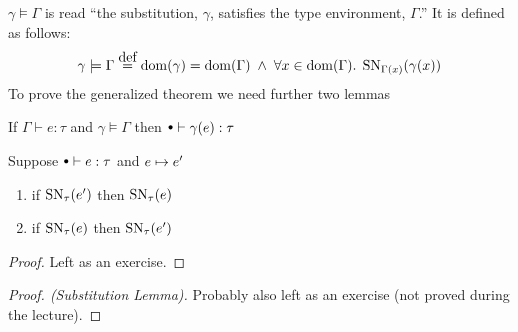 $\gamma \models \Gamma$ is read ``the substitution, $\gamma$, satisfies the type environment, $\Gamma$.'' It is defined as follows:
\[
  \gamma \models \Gamma \eqdef \dom(\gamma) = \dom(\Gamma) \pand 
                 \forall x \in \dom(\Gamma). \; \SN{\Gamma(x)}{\gamma(x)}
\]
To prove the generalized theorem we need further two lemmas
\begin{substlem}
  If $\Gamma \vdash e : \tau$ and $\gamma \models \Gamma$ then $\mtenv \vdash \gamma (e) : \tau$
\end{substlem}
\begin{forback}
  Suppose $\mtenv \vdash e : \tau$ and $e \mapsto e'$
  \begin{enumerate}
  \item if $\operatorname{SN}_{\tau}(e')$ then $\operatorname{SN}_{\tau}(e)$
  \item if $\operatorname{SN}_{\tau}(e)$ then $\operatorname{SN}_{\tau}(e')$
  \end{enumerate}
\end{forback}
\begin{proof}
  Left as an exercise.
\end{proof}
\begin{proof}[Proof. (Substitution Lemma)] 
  Probably also left as an exercise (not proved during the lecture).
\end{proof}
